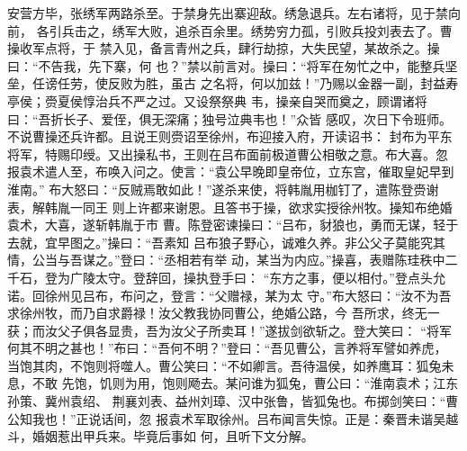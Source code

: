 安营方毕，张绣军两路杀至。于禁身先出寨迎敌。绣急退兵。左右诸将，见于禁向前，
各引兵击之，绣军大败，追杀百余里。绣势穷力孤，引败兵投刘表去了。曹操收军点将，于
禁入见，备言青州之兵，肆行劫掠，大失民望，某故杀之。操曰：“不告我，先下寨，何
也？”禁以前言对。操曰：“将军在匆忙之中，能整兵坚垒，任谤任劳，使反败为胜，虽古
之名将，何以加兹！”乃赐以金器一副，封益寿亭侯；赍夏侯惇治兵不严之过。又设祭祭典
韦，操亲自哭而奠之，顾谓诸将曰：“吾折长子、爱侄，俱无深痛；独号泣典韦也！”众皆
感叹，次日下令班师。不说曹操还兵许都。且说王则赍诏至徐州，布迎接入府，开读诏书：
封布为平东将军，特赐印绶。又出操私书，王则在吕布面前极道曹公相敬之意。布大喜。忽
报袁术遣人至，布唤入问之。使言：“袁公早晚即皇帝位，立东宫，催取皇妃早到淮南。”
布大怒曰：“反贼焉敢如此！”遂杀来使，将韩胤用枷钉了，遣陈登赍谢表，解韩胤一同王
则上许都来谢恩。且答书于操，欲求实授徐州牧。操知布绝婚袁术，大喜，遂斩韩胤于市
曹。陈登密谏操曰：“吕布，豺狼也，勇而无谋，轻于去就，宜早图之。”操曰：“吾素知
吕布狼子野心，诚难久养。非公父子莫能究其情，公当与吾谋之。”登曰：“丞相若有举
动，某当为内应。”操喜，表赠陈珪秩中二千石，登为广陵太守。登辞回，操执登手曰：
“东方之事，便以相付。”登点头允诺。回徐州见吕布，布问之，登言：“父赠禄，某为太
守。”布大怒曰：“汝不为吾求徐州牧，而乃自求爵禄！汝父教我协同曹公，绝婚公路，今
吾所求，终无一获；而汝父子俱各显贵，吾为汝父子所卖耳！”遂拔剑欲斩之。登大笑曰：
“将军何其不明之甚也！”布曰：“吾何不明？”登曰：“吾见曹公，言养将军譬如养虎，
当饱其肉，不饱则将噬人。曹公笑曰：“不如卿言。吾待温侯，如养鹰耳：狐兔未息，不敢
先饱，饥则为用，饱则飏去。某问谁为狐兔，曹公曰：“淮南袁术；江东孙策、冀州袁绍、
荆襄刘表、益州刘璋、汉中张鲁，皆狐兔也。布掷剑笑曰：“曹公知我也！”正说话间，忽
报袁术军取徐州。吕布闻言失惊。正是：秦晋未谐吴越斗，婚姻惹出甲兵来。毕竟后事如
何，且听下文分解。